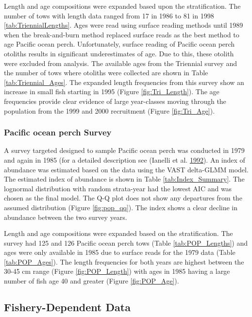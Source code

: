 \documentclass[12pt,]{article}
\begin{document}
Length and age compositions were expanded based upon the stratification.
The number of tows with length data ranged from 17 in 1986 to 81 in 1998
\ref{tab:TriennialLengths}. Ages were read using surface reading methods
until 1989 when the break-and-burn method replaced surface reads as the
best method to age Pacific ocean perch. Unfortunately, surface reading
of Pacific ocean perch otoliths results in significant underestimates of
age. Due to this, these otolith were excluded from analysis. The
available ages from the Triennial survey and the number of tows where
otoliths were collected are shown in Table \ref{tab:Triennial_Ages}. The
expanded length frequencies from this survey show an increase in small
fish starting in 1995 (Figure \ref{fig:Tri_Length}). The age frequencies
provide clear evidence of large year-classes moving through the
population from the 1999 and 2000 recruitment (Figure
\ref{fig:Tri_Age}).

\subsubsection{Pacific ocean perch
Survey}\label{pacific-ocean-perch-survey}

A survey targeted designed to sample Pacific ocean perch was conducted
in 1979 and again in 1985 (for a detailed description see (Ianelli et
al. \protect\hyperlink{ref-ianelli_status_1992}{1992}). An index of
abundance was estimated based on the data using the VAST delta-GLMM
model. The estimated index of abundance is shown in Table
\ref{tab:Index_Summary}. The lognormal distribution with random
strata-year had the lowest AIC and was chosen as the final model. The
Q-Q plot does not show any departures from the assumed distribution
(Figure \ref{fig:pop_qq}). The index shows a clear decline in abundance
between the two survey years.

Length and age compositions were expanded based on the stratification.
The survey had 125 and 126 Pacific ocean perch tows (Table
\ref{tab:POP_Lengths}) and ages were only available in 1985 due to
surface reads for the 1979 data (Table \ref{tab:POP_Ages}). The length
frequencies for both years are highest between the 30-45 cm range
(Figure \ref{fig:POP_Length}) with ages in 1985 having a large number of
fish age 40 and greater (Figure \ref{fig:POP_Age}).

\subsection{Fishery-Dependent Data}\label{fishery-dependent-data}
\end{document}
